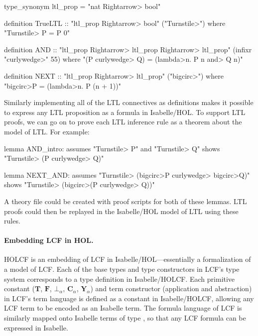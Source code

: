 \begin{isacode}
type_synonym ltl_prop = "nat \<Rightarrow> bool"
\end{isacode}
\unmedskip
\begin{isacode}
definition TrueLTL :: "ltl_prop \<Rightarrow> bool" ("\<Turnstile>")
  where "\<Turnstile> P = P 0"
\end{isacode}
\unmedskip
\begin{isacode}
definition AND :: "ltl_prop \<Rightarrow> ltl_prop \<Rightarrow> ltl_prop" (infixr "\<curlywedge>" 55)
  where "(P \<curlywedge> Q) = (\<lambda>n. P n \<and> Q n)"
\end{isacode}
\unmedskip
\begin{isacode}
definition NEXT :: "ltl_prop \<Rightarrow> ltl_prop" ("\<bigcirc>")
  where "\<bigcirc>P = (\<lambda>n. P (n + 1))"
\end{isacode}

Similarly implementing all of the LTL connectives as definitions makes it possible to express any LTL proposition as a formula in Isabelle/HOL. To support LTL proofs, we can go on to prove each LTL inference rule as a theorem about the model of LTL. For example:
%
\begin{isacode}
lemma AND_intro:
  assumes "\<Turnstile> P" and "\<Turnstile> Q" shows "\<Turnstile> (P \<curlywedge> Q)"
\end{isacode}
\unmedskip
\begin{isacode}
lemma NEXT_AND:
  assumes "\<Turnstile> (\<bigcirc>P \<curlywedge> \<bigcirc>Q)" shows "\<Turnstile> (\<bigcirc>(P \<curlywedge> Q))"
\end{isacode}
%
A theory file could be created with proof scripts for both of these lemmas. LTL proofs could then be replayed in the Isabelle/HOL model of LTL using these rules.

\paragraph{Embedding LCF in HOL.}

HOLCF is an embedding of LCF in Isabelle/HOL---essentially a formalization of a model of LCF. Each of the base types and type constructors in LCF's type system corresponds to a type definition in Isabelle/HOLCF. Each primitive constant ($\mathbf{T}$, $\mathbf{F}$, $\bot_\alpha$, $\mathbf{C}_\alpha$, $\mathbf{Y}_\alpha$) and term constructor (application and abstraction) in LCF's term language is defined as a constant in Isabelle/HOLCF, allowing any LCF term to be encoded as an Isabelle term. The formula language of LCF is similarly mapped onto Isabelle terms of type , so that any LCF formula can be expressed in Isabelle.

